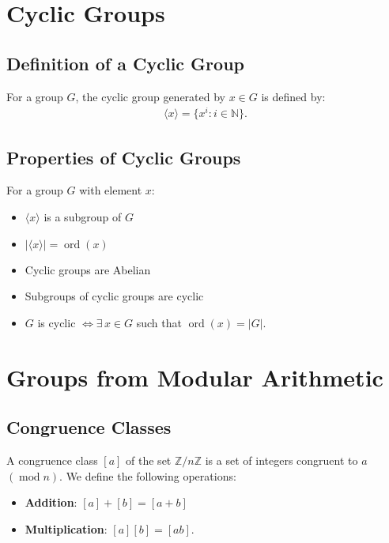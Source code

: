 \documentclass[a4paper, 12pt, twoside]{article}
\DeclareMathOperator{\Ord}{ord}
\DeclareMathOperator{\Mod}{mod}
\begin{document}
\newpage

\section{Cyclic Groups}

\subsection{Definition of a Cyclic Group}

For a group $G$, the cyclic group generated by $x \in G$ is defined by:
\begin{align*}
      \langle x \rangle = \{x^i : i \in \mathbb{N}\}.
\end{align*}

\subsection{Properties of Cyclic Groups}

For a group $G$ with element $x$:

\begin{itemize}
      \item $\langle x \rangle$ is a subgroup of $G$
      \item $|\langle x \rangle| = \Ord(x)$
      \item Cyclic groups are Abelian
      \item Subgroups of cyclic groups are cyclic
      \item $G$ is cyclic $\Leftrightarrow \exists \, x \in G$ such
            that $\Ord(x) = |G|$.
\end{itemize}

\section{Groups from Modular Arithmetic}

\subsection{Congruence Classes}

A congruence class $[a]$ of the set $\mathbb{Z}/n\mathbb{Z}$ is a set
of integers congruent to $a$ $(\Mod n)$. We define the following
operations:

\begin{itemize}
      \item \textbf{Addition}: $[a] + [b] = [a + b]$
      \item \textbf{Multiplication}: $[a][b] = [ab]$.
\end{itemize}
\end{document}
